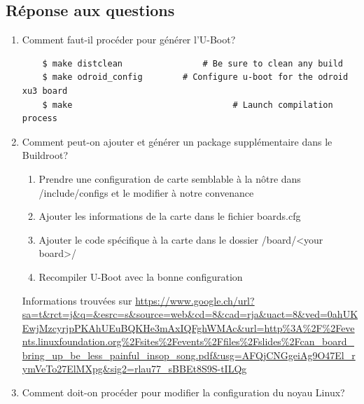 \subsection{Réponse aux questions}
\begin{enumerate}
	\item Comment faut-il procéder pour générer l'U-Boot?
	\begin{lstlisting}
	$ make distclean				# Be sure to clean any build
	$ make odroid_config		# Configure u-boot for the odroid xu3 board
	$ make								  # Launch compilation process
	\end{lstlisting}
	\item Comment peut-on ajouter et générer un package supplémentaire dans le Buildroot?\\
	
	\begin{enumerate}
		\item Prendre une configuration de carte semblable à la nôtre dans /include/configs et le modifier à notre convenance
		\item Ajouter les informations de la carte dans le fichier boards.cfg
		\item Ajouter le code spécifique à la carte dans le dossier /board/<your board>/
		\item Recompiler U-Boot avec la bonne configuration
	\end{enumerate}
	Informations trouvées sur \url{https://www.google.ch/url?sa=t&rct=j&q=&esrc=s&source=web&cd=8&cad=rja&uact=8&ved=0ahUKEwjMzcyrjpPKAhUEuBQKHe3mAxIQFghWMAc&url=http%3A%2F%2Fevents.linuxfoundation.org%2Fsites%2Fevents%2Ffiles%2Fslides%2Fcan_board_bring_up_be_less_painful_insop_song.pdf&usg=AFQjCNGgeiAg9O47El_rymVeTo27ElMXpg&sig2=rlau77_sBBEt8S9S-tILQg}
	\item Comment doit-on procéder pour modifier la configuration du noyau Linux?\\
	

\end{enumerate}
